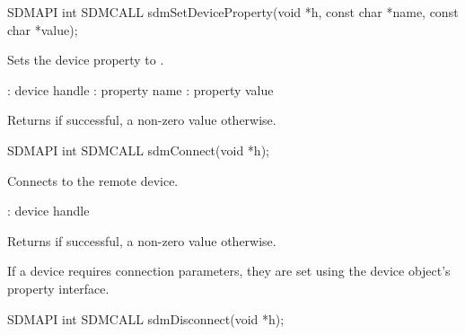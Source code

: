 \documentclass[a4paper,12pt,twoside,extrafontsizes]{memoir}
\begin{document}

\begin{cfuncprototype}
SDMAPI int SDMCALL sdmSetDeviceProperty(void *h, const char *name, const char *value);
\end{cfuncprototype}

\begin{funcdescr}
	Sets the device property  to .
\end{funcdescr}

\begin{funcparams}
	: device handle
	: property name
	: property value
\end{funcparams}

\begin{funcret}
	Returns  if successful, a non-zero value otherwise.
\end{funcret}



\begin{cfuncprototype}
SDMAPI int SDMCALL sdmConnect(void *h);
\end{cfuncprototype}

\begin{funcdescr}
	Connects to the remote device.
\end{funcdescr}

\begin{funcparams}
	: device handle
\end{funcparams}

\begin{funcret}
	Returns  if successful, a non-zero value otherwise.
\end{funcret}

\begin{funcremarks}
	If a device requires connection parameters, they are set using the device object's property interface.
\end{funcremarks}



\begin{cfuncprototype}
SDMAPI int SDMCALL sdmDisconnect(void *h);
\end{cfuncprototype}
\end{document}
